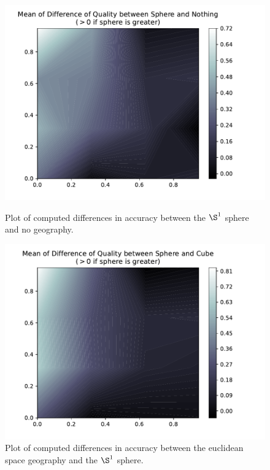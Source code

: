 \documentclass[math, info, english]{cours}
\begin{document}
\begin{figure}[h]
	\centering
	\hfill
	\begin{minipage}{.45\textwidth}
		\includegraphics[width=\linewidth]{../Figures/qual_diff_sphere_none}
		\caption{Plot of computed differences in accuracy between the $\S^{1}$ sphere and no geography.}
	\label{nonesphere}
	\end{minipage}
	\hfill
	\begin{minipage}{.45\textwidth}
		\includegraphics[width=\linewidth]{../Figures/qual_diff_sphere_cube}
	\caption{Plot of computed differences in accuracy between the euclidean space geography and the $\S^{1}$ sphere.}
	\label{cubesphere}
	\end{minipage}
	\hfill
\end{figure}
\end{document}
